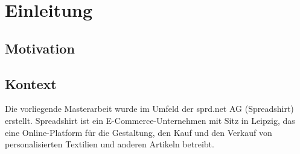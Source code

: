 \chapter{Einleitung}

\section{Motivation}

\section{Kontext}

Die vorliegende Masterarbeit wurde im Umfeld der sprd.net AG (Spreadshirt) erstellt. Spreadshirt ist ein E-Commerce-Unternehmen mit Sitz in Leipzig, das eine Online-Platform für die Gestaltung, den Kauf und den Verkauf von personalisierten Textilien und anderen Artikeln betreibt.
